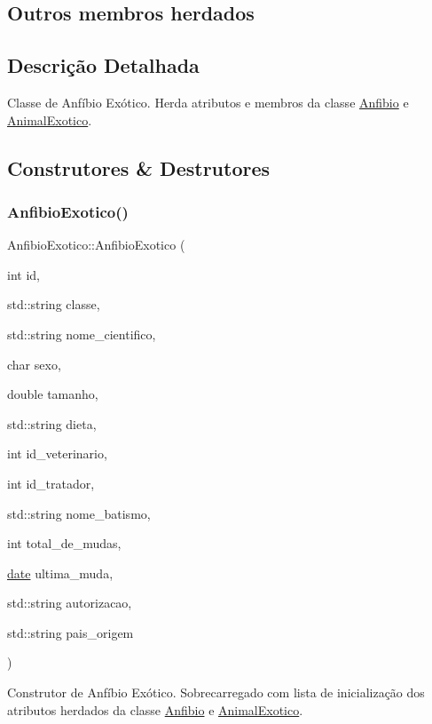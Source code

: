 \subsection*{Outros membros herdados}


\subsection{Descrição Detalhada}
Classe de Anfíbio Exótico. Herda atributos e membros da classe \hyperlink{classAnfibio}{Anfibio} e \hyperlink{classAnimalExotico}{Animal\+Exotico}. 

\subsection{Construtores \& Destrutores}
\mbox{\label{classAnfibioExotico_a7267ae2ab0422f796970751b7fa180e0}} 
\subsubsection{\texorpdfstring{Anfibio\+Exotico()}{AnfibioExotico()}}
{\footnotesize\ttfamily Anfibio\+Exotico\+::\+Anfibio\+Exotico (\begin{DoxyParamCaption}\item[{int}]{id,  }\item[{std\+::string}]{classe,  }\item[{std\+::string}]{nome\+\_\+cientifico,  }\item[{char}]{sexo,  }\item[{double}]{tamanho,  }\item[{std\+::string}]{dieta,  }\item[{int}]{id\+\_\+veterinario,  }\item[{int}]{id\+\_\+tratador,  }\item[{std\+::string}]{nome\+\_\+batismo,  }\item[{int}]{total\+\_\+de\+\_\+mudas,  }\item[{\hyperlink{classdate}{date}}]{ultima\+\_\+muda,  }\item[{std\+::string}]{autorizacao,  }\item[{std\+::string}]{pais\+\_\+origem }\end{DoxyParamCaption})}

Construtor de Anfíbio Exótico. Sobrecarregado com lista de inicialização dos atributos herdados da classe \hyperlink{classAnfibio}{Anfibio} e \hyperlink{classAnimalExotico}{Animal\+Exotico}. \mbox{\label{classAnfibioExotico_a2615151a98a1713a0d8c65d97bccd813}} 
